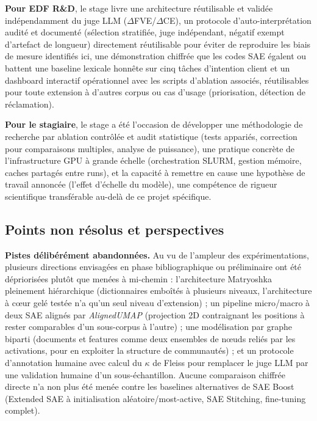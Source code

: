 \documentclass[11pt]{article}
\begin{document}
\textbf{Pour EDF R\&D}, le stage livre une architecture réutilisable et validée
indépendamment du juge LLM ($\Delta$FVE/$\Delta$CE), un protocole d'auto-interprétation
audité et documenté (sélection stratifiée, juge indépendant, négatif exempt d'artefact
de longueur) directement réutilisable pour éviter de reproduire les biais de mesure
identifiés ici, une démonstration chiffrée que les codes SAE égalent ou battent une
baseline lexicale honnête sur cinq tâches d'intention client et un dashboard interactif opérationnel avec les
scripts d'ablation associés, réutilisables pour toute extension à d'autres corpus ou
cas d'usage (priorisation, détection de réclamation).

\textbf{Pour le stagiaire}, le stage a été l'occasion de développer une méthodologie de
recherche par ablation contrôlée et audit statistique (tests appariés, correction pour
comparaisons multiples, analyse de puissance), une pratique concrète de l'infrastructure
GPU à grande échelle (orchestration SLURM, gestion mémoire, caches partagés entre runs),
et la capacité à
remettre en cause une hypothèse de travail annoncée (l'effet d'échelle du
modèle), une compétence
de rigueur scientifique transférable au-delà de ce projet spécifique.

\subsection{Points non résolus et perspectives}

\textbf{Pistes délibérément abandonnées.} Au vu de l'ampleur des expérimentations,
plusieurs directions envisagées en phase bibliographique ou préliminaire ont
été dépriorisées plutôt que menées à mi-chemin : l'architecture Matryoshka
pleinement hiérarchique (dictionnaires emboîtés à plusieurs niveaux,
l'architecture à cœur gelé testée n'a qu'un seul niveau d'extension) ; un
pipeline micro/macro à deux SAE alignés par \emph{AlignedUMAP} (projection 2D
contraignant les positions à rester comparables d'un sous-corpus à l'autre) ;
une modélisation par graphe biparti (documents et features comme deux
ensembles de nœuds reliés par les activations, pour en exploiter la structure
de communautés) ; et un protocole d'annotation humaine avec calcul du
$\kappa$ de Fleiss pour remplacer le juge LLM par une validation humaine d'un
sous-échantillon. Aucune comparaison chiffrée directe n'a non plus été menée
contre les baselines alternatives de SAE Boost (Extended SAE à
initialisation aléatoire/most-active, SAE Stitching, fine-tuning complet).
\end{document}
